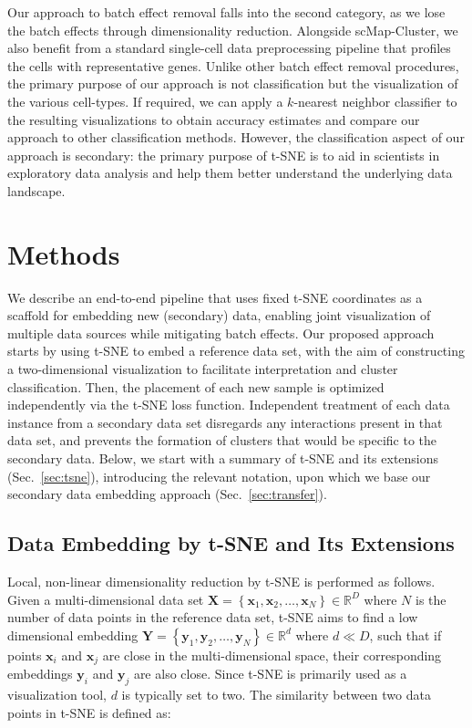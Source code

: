 \documentclass[runningheads]{llncs}
\begin{document}
Our approach to batch effect removal falls into the second category, as we
lose the batch effects through dimensionality reduction. Alongside
scMap-Cluster, we also benefit from a standard single-cell data preprocessing
pipeline that profiles the cells with representative genes. Unlike other
batch effect removal procedures, the primary purpose of our approach is not
classification but the visualization of the various cell-types. If required,
we can apply a $k$-nearest neighbor classifier to the resulting
visualizations to obtain accuracy estimates and compare our approach to other
classification methods. However, the classification aspect of our approach is
secondary: the primary purpose of t-SNE is to aid in scientists in
exploratory data analysis and help them better understand the underlying data
landscape.

\section{Methods}

We describe an end-to-end pipeline that uses fixed t-SNE coordinates as a
scaffold for embedding new (secondary) data, enabling joint visualization of
multiple data sources while mitigating batch effects. Our proposed approach
starts by using t\nobreakdash -SNE to embed a reference data set, with the aim
of constructing a two-dimensional visualization to facilitate interpretation
and cluster classification. Then, the placement of each new sample is optimized
independently via the t\nobreakdash -SNE loss function. Independent treatment
of each data instance from a secondary data set disregards any interactions
present in that data set, and prevents the formation of clusters that would be
specific to the secondary data. Below, we start with a summary of t-SNE and its
extensions (Sec.~\ref{sec:tsne}), introducing the relevant notation, upon which
we base our secondary data embedding approach (Sec.~\ref{sec:transfer}).


\subsection{Data Embedding by t-SNE and Its Extensions\label{sec:tsne}}

Local, non-linear dimensionality reduction by t-SNE is performed as follows.
Given a multi-dimensional data set $\mathbf{X} = \left \{ \mathbf{x}_1,
\mathbf{x}_2, \dots, \mathbf{x}_N \right \} \in \mathbb{R}^D$ where $N$ is the
number of data points in the reference data set, t-SNE aims to find a low
dimensional embedding $\mathbf{Y} = \left \{ \mathbf{y}_1, \mathbf{y}_2, \dots,
\mathbf{y}_N \right \} \in \mathbb{R}^d$ where $d \ll D$, such that if points
$\mathbf{x}_i$ and $\mathbf{x}_j$ are close in the multi-dimensional space,
their corresponding embeddings $\mathbf{y}_i$ and $\mathbf{y}_j$ are also
close. Since t-SNE is primarily used as a visualization tool, $d$ is typically
set to two. The similarity between two data points in t-SNE is defined as:
\end{document}
